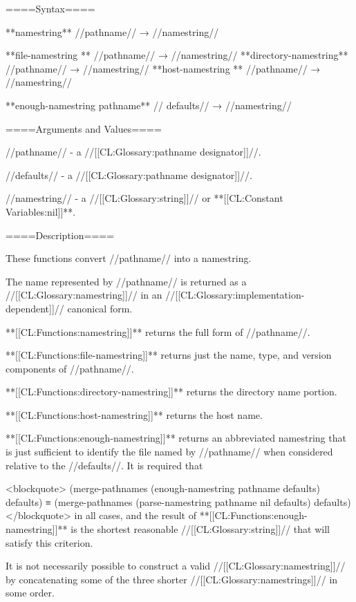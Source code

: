 
====Syntax====

**namestring** //pathname// → //namestring//

**file-namestring ** //pathname// → //namestring// **directory-namestring** //pathname// → //namestring// **host-namestring ** //pathname// → //namestring//

**enough-namestring {pathname** //\opt} defaults// → //namestring//

====Arguments and Values====

//pathname// - a //[[CL:Glossary:pathname designator]]//.


//defaults// - a //[[CL:Glossary:pathname designator]]//.


//namestring// - a //[[CL:Glossary:string]]// or **[[CL:Constant Variables:nil]]**. 

====Description====

These functions convert //pathname// into a namestring.

The name represented by //pathname// is returned as a //[[CL:Glossary:namestring]]// in an //[[CL:Glossary:implementation-dependent]]// canonical form.

**[[CL:Functions:namestring]]** returns the full form of //pathname//.

**[[CL:Functions:file-namestring]]** returns just the name, type, and version components of //pathname//.

**[[CL:Functions:directory-namestring]]** returns the directory name portion.

**[[CL:Functions:host-namestring]]** returns the host name.

**[[CL:Functions:enough-namestring]]** returns an abbreviated namestring that is just sufficient to identify the file named by //pathname// when considered relative to the //defaults//. It is required that

<blockquote> (merge-pathnames (enough-namestring pathname defaults) defaults) ≡ (merge-pathnames (parse-namestring pathname nil defaults) defaults) </blockquote> in all cases, and the result of **[[CL:Functions:enough-namestring]]** is the shortest reasonable //[[CL:Glossary:string]]// that will satisfy this criterion.

It is not necessarily possible to construct a valid //[[CL:Glossary:namestring]]// by concatenating some of the three shorter //[[CL:Glossary:namestrings]]// in some order.

